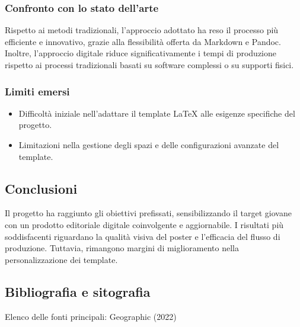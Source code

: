 \documentclass[
]{article}
\providecommand{\tightlist}{%
  \setlength{\itemsep}{0pt}\setlength{\parskip}{0pt}}
\begin{document}
\subsubsection{Confronto con lo stato
dell'arte}\label{confronto-con-lo-stato-dellarte}

Rispetto ai metodi tradizionali, l'approccio adottato ha reso il
processo più efficiente e innovativo, grazie alla flessibilità offerta
da Markdown e Pandoc. Inoltre, l'approccio digitale riduce
significativamente i tempi di produzione rispetto ai processi
tradizionali basati su software complessi o su supporti fisici.

\subsubsection{Limiti emersi}\label{limiti-emersi}

\begin{itemize}
\tightlist
\item
  Difficoltà iniziale nell'adattare il template LaTeX alle esigenze
  specifiche del progetto.
\item
  Limitazioni nella gestione degli spazi e delle configurazioni avanzate
  del template.
\end{itemize}

\subsection{Conclusioni}\label{conclusioni}

Il progetto ha raggiunto gli obiettivi prefissati, sensibilizzando il
target giovane con un prodotto editoriale digitale coinvolgente e
aggiornabile. I risultati più soddisfacenti riguardano la qualità visiva
del poster e l'efficacia del flusso di produzione. Tuttavia, rimangono
margini di miglioramento nella personalizzazione dei template.

\subsection{Bibliografia e sitografia}\label{bibliografia-e-sitografia}

Elenco delle fonti principali: Geographic (2022)
\end{document}
